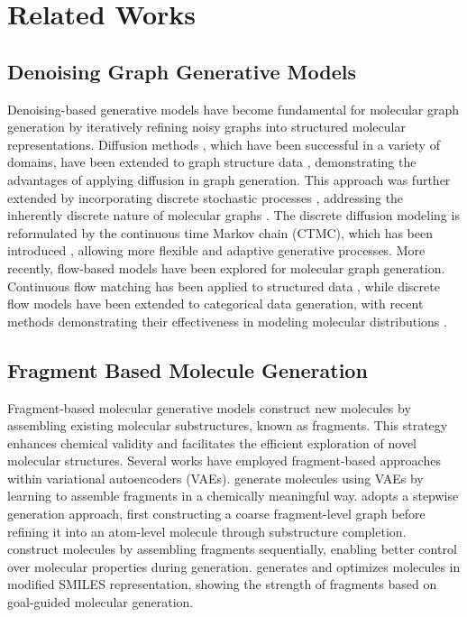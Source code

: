 \section{Related Works}


\subsection{Denoising Graph Generative Models}

Denoising-based generative models have become fundamental for molecular graph generation by iteratively refining noisy graphs into structured molecular representations. 
Diffusion methods \citep{ddpm, sde}, which have been successful in a variety of domains, have been extended to graph structure data \citep{gdss, score_based_graph_generation}, demonstrating the advantages of applying diffusion in graph generation. 
This approach was further extended by incorporating discrete stochastic processes \citep{d3pm}, addressing the inherently discrete nature of molecular graphs \citep{digress}.
The discrete diffusion modeling is reformulated by the continuous time Markov chain (CTMC), which has been introduced \citep{disco, cometh, ddsbm}, allowing more flexible and adaptive generative processes. 
More recently, flow-based models have been explored for molecular graph generation. 
Continuous flow matching \citep{cfm} has been applied to structured data \citep{catflow}, while discrete flow models \citep{dfm_1, dfm_2} have been extended to categorical data generation, with recent methods demonstrating their effectiveness in modeling molecular distributions \citep{defog, ggflow}.


\subsection{Fragment Based Molecule Generation}

Fragment-based molecular generative models construct new molecules by assembling existing molecular substructures, known as fragments. 
This strategy enhances chemical validity and facilitates the efficient exploration of novel molecular structures.
Several works have employed fragment-based approaches within variational autoencoders (VAEs). 
\citet{multi-obj_molecule_substruct, molgen_by_principal_subgraph_mining, learn_to_extend_scaff} generate molecules using VAEs by learning to assemble fragments in a chemically meaningful way. 
\citet{jtvae} adopts a stepwise generation approach, first constructing a coarse fragment-level graph before refining it into an atom-level molecule through substructure completion. 
\citet{bbar, multi-obj_molecule_substruct} construct molecules by assembling fragments sequentially, enabling better control over molecular properties during generation.
\citet{safe_mol_design, genmol, f-rag} generates and optimizes molecules in modified SMILES representation, showing the strength of fragments based on goal-guided molecular generation.

